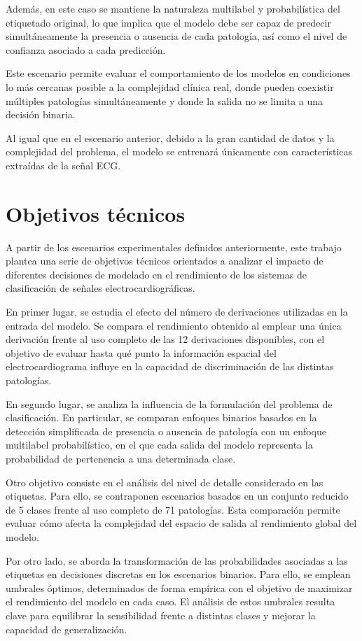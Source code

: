\documentclass[12pt,a4paper,twoside]{book}
\begin{document}
Además, en este caso se mantiene la naturaleza multilabel y probabilística del etiquetado original, lo que implica que el modelo debe ser capaz de predecir simultáneamente la presencia o ausencia de cada patología, así como el nivel de confianza asociado a cada predicción.

Este escenario permite evaluar el comportamiento de los modelos en condiciones lo más cercanas posible a la complejidad clínica real, donde pueden coexistir múltiples patologías simultáneamente y donde la salida no se limita a una decisión binaria.

Al igual que en el escenario anterior, debido a la gran cantidad de datos y la complejidad del problema, el modelo se entrenará únicamente con características extraídas de la señal ECG.

\section{Objetivos técnicos}

A partir de los escenarios experimentales definidos anteriormente, este trabajo plantea una serie de objetivos técnicos orientados a analizar el impacto de diferentes decisiones de modelado en el rendimiento de los sistemas de clasificación de señales electrocardiográficas.

En primer lugar, se estudia el efecto del número de derivaciones utilizadas en la entrada del modelo. 
Se compara el rendimiento obtenido al emplear una única derivación frente al uso completo de las 12 derivaciones disponibles, con el objetivo de evaluar hasta qué punto la información espacial del electrocardiograma influye en la capacidad de discriminación de las distintas patologías.

En segundo lugar, se analiza la influencia de la formulación del problema de clasificación. 
En particular, se comparan enfoques binarios basados en la detección simplificada de presencia o ausencia de patología con un enfoque multilabel probabilístico, en el que cada salida del modelo representa la probabilidad de pertenencia a una determinada clase.

Otro objetivo consiste en el análisis del nivel de detalle considerado en las etiquetas. 
Para ello, se contraponen escenarios basados en un conjunto reducido de 5 clases frente al uso completo de 71 patologías. 
Esta comparación permite evaluar cómo afecta la complejidad del espacio de salida al rendimiento global del modelo.

Por otro lado, se aborda la transformación de las probabilidades asociadas a las etiquetas en decisiones discretas en los escenarios binarios. 
Para ello, se emplean umbrales óptimos, determinados de forma empírica con el objetivo de maximizar el rendimiento del modelo en cada caso. 
El análisis de estos umbrales resulta clave para equilibrar la sensibilidad frente a distintas clases y mejorar la capacidad de generalización.
\end{document}
